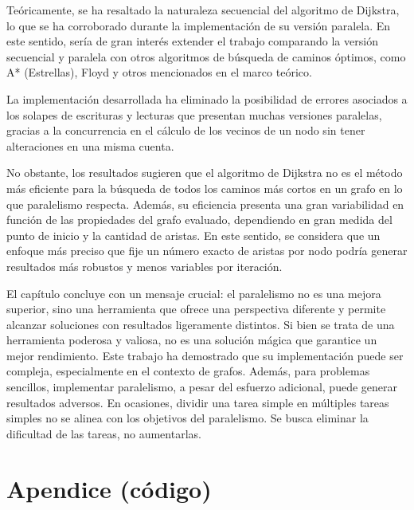 Teóricamente, se ha resaltado la naturaleza secuencial del algoritmo de Dijkstra, lo que se ha corroborado durante la implementación de su versión paralela. En este sentido, sería de gran interés extender el trabajo comparando la versión secuencial y paralela con otros algoritmos de búsqueda de caminos óptimos, como A* (Estrellas), Floyd y otros mencionados en el marco teórico.

La implementación desarrollada ha eliminado la posibilidad de errores asociados a los solapes de escrituras y lecturas que presentan muchas versiones paralelas, gracias a la concurrencia en el cálculo de los vecinos de un nodo sin tener alteraciones en una misma cuenta.

No obstante, los resultados sugieren que el algoritmo de Dijkstra no es el método más eficiente para la búsqueda de todos los caminos más cortos en un grafo en lo que paralelismo respecta. Además, su eficiencia presenta una gran variabilidad en función de las propiedades del grafo evaluado, dependiendo en gran medida del punto de inicio y la cantidad de aristas. En este sentido, se considera que un enfoque más preciso que fije un número exacto de aristas por nodo podría generar resultados más robustos y menos variables por iteración.

El capítulo concluye con un mensaje crucial: el paralelismo no es una mejora superior, sino una herramienta que ofrece una perspectiva diferente y permite alcanzar soluciones con resultados ligeramente distintos. Si bien se trata de una herramienta poderosa y valiosa, no es una solución mágica que garantice un mejor rendimiento. Este trabajo ha demostrado que su implementación puede ser compleja, especialmente en el contexto de grafos. Además, para problemas sencillos, implementar paralelismo, a pesar del esfuerzo adicional, puede generar resultados adversos. En ocasiones, dividir una tarea simple en múltiples tareas simples no se alinea con los objetivos del paralelismo. Se busca eliminar la dificultad de las tareas, no aumentarlas.




\section{Apendice (código)}

